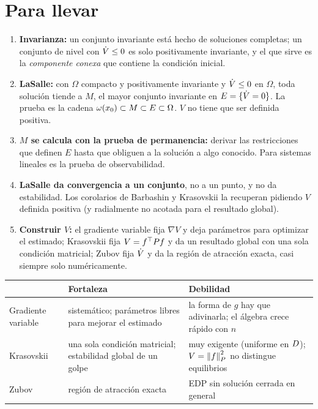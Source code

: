 \section{Para llevar}
\label{sec:iv-cierre}

\begin{parallevar}
\begin{enumerate}
  \item \textbf{Invarianza:} un conjunto invariante está hecho de soluciones completas; un conjunto de nivel con $\dot V\le0$ es solo positivamente invariante, y el que sirve es la \emph{componente conexa} que contiene la condición inicial.
  \item \textbf{LaSalle:} con $\Omega$ compacto y positivamente invariante y $\dot V\le0$ en $\Omega$, toda solución tiende a $M$, el mayor conjunto invariante en $E=\{\dot V=0\}$. La prueba es la cadena $\omega(x_0)\subset M\subset E\subset\Omega$. $V$ no tiene que ser definida positiva.
  \item \textbf{$M$ se calcula con la prueba de permanencia:} derivar las restricciones que definen $E$ hasta que obliguen a la solución a algo conocido. Para sistemas lineales es la prueba de observabilidad.
  \item \textbf{LaSalle da convergencia a un conjunto}, no a un punto, y no da estabilidad. Los corolarios de Barbashin y Krasovskii la recuperan pidiendo $V$ definida positiva (y radialmente no acotada para el resultado global).
  \item \textbf{Construir $V$:} el gradiente variable fija $\nabla V$ y deja parámetros para optimizar el estimado; Krasovskii fija $V=f^{\top} Pf$ y da un resultado global con una sola condición matricial; Zubov fija $\dot V$ y da la región de atracción exacta, casi siempre solo numéricamente.
\end{enumerate}
\end{parallevar}

\begin{center}
\small
\begin{tabular}{@{}p{2.4cm}p{4.4cm}p{5.0cm}@{}}
\toprule
& Fortaleza & Debilidad \\
\midrule
Gradiente variable & sistemático; parámetros libres para mejorar el estimado & la forma de $g$ hay que adivinarla; el álgebra crece rápido con $n$ \\
Krasovskii & una sola condición matricial; estabilidad global de un golpe & muy exigente (uniforme en $D$); $V=\left\lVert f\right\rVert_P^2$ no distingue equilibrios \\
Zubov & región de atracción exacta & EDP sin solución cerrada en general \\
\bottomrule
\end{tabular}
\end{center}


